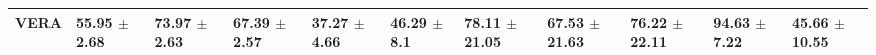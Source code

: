 \begin{tabular}{lllllllllll}
VERA  &             55.95 {\footnotesize $\pm$ 2.68} &  73.97 {\footnotesize $\pm$ 2.63} &  \bfseries{67.39 {\footnotesize $\pm$ 2.57}} &              37.27 {\footnotesize $\pm$ 4.66} &               46.29 {\footnotesize $\pm$ 8.1} &  \bfseries{78.11 {\footnotesize $\pm$ 21.05}} &            67.53 {\footnotesize $\pm$ 21.63} &  76.22 {\footnotesize $\pm$ 22.11} &             94.63 {\footnotesize $\pm$ 7.22} &  45.66 {\footnotesize $\pm$ 10.55} \\
\bottomrule
\end{tabular}